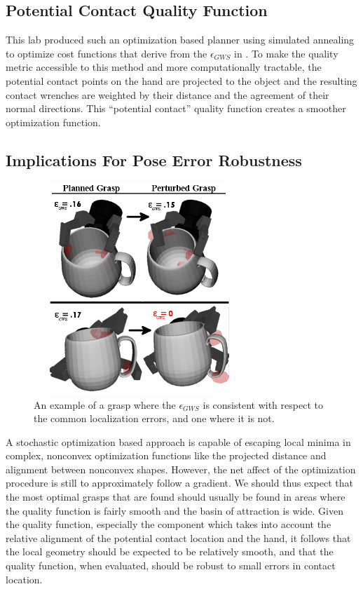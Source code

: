 \subsection{Potential Contact Quality Function}
This lab produced such an optimization based planner using simulated annealing to optimize cost functions that derive from the $\epsilon_{GWS}$ in \cite{Ciocarlie2008}. To make the quality metric accessible to this method and more computationally tractable, the potential contact points on the hand are projected to the object and the resulting contact wrenches are weighted by their distance and the agreement of their normal directions. This ``potential contact'' quality function creates a smoother optimization function. 

\subsection{Implications For Pose Error Robustness}
\label{sec:implications_for_robustness}
\begin{figure}[h]
\begin{center}
\includegraphics[height=80mm,width=80mm]{mug_grasps_combined_4.png}
\caption{An example of a grasp where the $\epsilon_{GWS}$ is consistent with respect to the common localization errors, and one where it is not.}
\label{fig:pose_robust_mug}
\end{center}
\end{figure}

A stochastic optimization based approach is capable of escaping local minima in complex, nonconvex optimization functions like the projected distance and alignment between nonconvex shapes. However, the net affect of the optimization procedure is still to approximately follow a gradient. We should thus expect that the most optimal grasps that are found should usually be found in areas where the quality function is fairly smooth and the basin of attraction is wide. Given the quality function, especially the component which takes into account the relative alignment of the potential contact location and the hand, it follows that the local geometry should be expected to be relatively smooth, and that the quality function, when evaluated, should be robust to small errors in contact location. 

